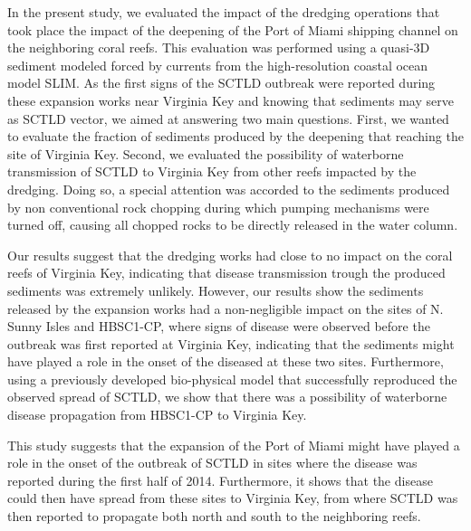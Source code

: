 \documentclass[preprint,12pt,authoryear]{elsarticle}
\begin{document}
In the present study, we evaluated the impact of the dredging operations that took place the impact of the deepening of the Port of Miami shipping channel on the neighboring coral reefs. This evaluation was performed using a quasi-3D sediment modeled forced by currents from the high-resolution coastal ocean model SLIM. As the first signs of the SCTLD outbreak were reported during these expansion works near Virginia Key and knowing that sediments may serve as SCTLD vector, we aimed at answering two main questions. First, we wanted to evaluate the fraction of sediments produced by the deepening that reaching the site of Virginia Key. Second, we evaluated the possibility of waterborne transmission of SCTLD to Virginia Key from other reefs impacted by the dredging. Doing so, a special attention was accorded to the sediments produced by non conventional rock chopping during which pumping mechanisms were turned off, causing all chopped rocks to be directly released in the water column.

Our results suggest that the dredging works had close to no impact on the coral reefs of Virginia Key, indicating that disease transmission trough the produced sediments was extremely unlikely. However, our results show the sediments released by the expansion works had a non-negligible impact on the sites of N. Sunny Isles and HBSC1-CP, where signs of disease were observed before the outbreak was first reported at Virginia Key, indicating that the sediments might have played a role in the onset of the diseased at these two sites. Furthermore, using a previously developed bio-physical model that successfully reproduced the observed spread of SCTLD, we show that there was a possibility of waterborne disease propagation from HBSC1-CP to Virginia Key.

This study suggests that the expansion of the Port of Miami might have played a role in the onset of the outbreak of SCTLD in sites where the disease was reported during the first half of 2014. Furthermore, it shows that the disease could then have spread from these sites to Virginia Key, from where SCTLD was then reported to propagate both north and south to the neighboring reefs.

 

\end{document}
